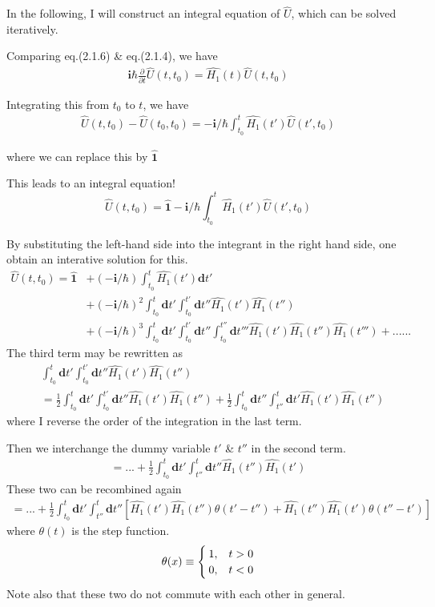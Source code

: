  In the following, I will construct an integral equation of $\hat{U}$, which can be solved iteratively.

 Comparing eq.(2.1.6) \& eq.(2.1.4), we have
\begin{align}\tag{2.1.6''}
\bm{i}\hbar \frac{\partial}{\partial t} \hat{U}(t,t_0)=\hat{H_1}(t)\hat{U}(t,t_0) \nonumber
\end{align}

 Integrating this from $t_0$ to $t$, we have 
\begin{align}
\hat{U}(t,t_0)-\hat{U}(t_0,t_0)=-\bm{i}/\hbar \int_{t_0}^{t} \hat{H_1}(t')\hat{U}(t',t_0) \nonumber
\end{align}

 where we can replace this by $\hat{\bm{1}}$

 This leads to an integral equation!
\begin{equation}
\hat{U}(t,t_0)=\hat{\bm{1}}-\bm{i}/\hbar \int_{t_0}^{t} \hat{H_1}(t')\hat{U}(t',t_0) \nonumber
\end{equation}

 By substituting the left-hand side into the integrant in the right hand side, one obtain an interative solution for this.
\begin{align}
\hat{U}(t,t_0)=\hat{\bm{1}} &+(-\bm{i}/\hbar) \int_{t_0}^{t} \hat{H_1}(t')\bm{d}t' \nonumber\\
&+(-\bm{i}/\hbar)^2\int_{t_0}^{t}\bm{d}t'\int_{t_0}^{t'}\bm{d}t''\hat{H_1}(t')\hat{H_1}(t'')\nonumber\\
&+(-\bm{i}/\hbar)^3  \int_{t_0}^{t}\bm{d}t'\int_{t_0}^{t'}\bm{d}t''\int_{t_0}^{t''}\bm{d}t'''\hat{H_1}(t')\hat{H_1}(t'')\hat{H_1}(t''')+...... \nonumber
\end{align}
The third term may be rewritten as
\begin{align}
&\int_{t_0}^{t}\bm{d}t'\int_{t_0}^{t'}\bm{d}t''\hat{H_1}(t')\hat{H_1}(t'')\nonumber\\
&=\frac{1}{2}\int_{t_0}^{t}\bm{d}t'\int_{t_0}^{t'}\bm{d}t''\hat{H_1}(t')\hat{H_1}(t'')+\frac{1}{2}\int_{t_0}^{t}\bm{d}t''\int_{t''}^{t}\bm{d}t'\hat{H_1}(t')\hat{H_1}(t'')\nonumber
\end{align}
where I reverse the order of the integration in the last term.

 Then we interchange the dummy variable $t'$ \& $t''$ in the second term.
\begin{align}
=...+\frac{1}{2}\int_{t_0}^{t}\bm{d}t'\int_{t''}^{t}\bm{d}t''\hat{H_1}(t'')\hat{H_1}(t')\nonumber
\end{align}
 These two can be recombined again
\begin{align}
=...+\frac{1}{2}\int_{t_0}^{t}\bm{d}t'\int_{t''}^{t}\bm{d}t''[\hat{H_1}(t')\hat{H_1}(t'')\theta(t'-t'')+\hat{H_1}(t'')\hat{H_1}(t')\theta(t''-t')]\nonumber
\end{align}
where $\theta(t)$ is the step function.
\begin{eqnarray}
\theta(x)\equiv
\begin{cases}
1, &t>0 \cr 0, &t<0\end{cases} \nonumber
\end{eqnarray}
 Note also that these two do not commute with each other in general.

